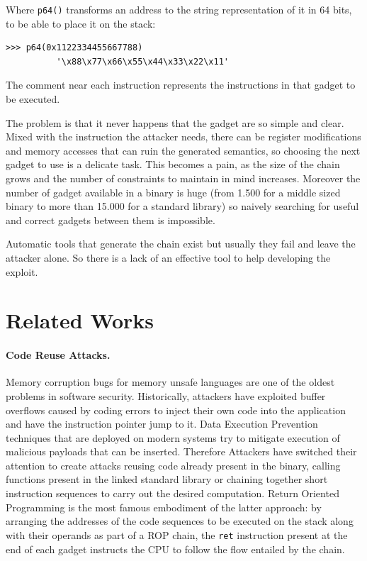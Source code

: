 \documentclass[twocolumn, 11pt]{article}
\begin{document}
\bigskip
Where \texttt{p64()} transforms an address to the string representation of it in 64 bits, to be able to place it on the stack:
\begin{lstlisting}
>>> p64(0x1122334455667788)
          '\x88\x77\x66\x55\x44\x33\x22\x11'
\end{lstlisting}

The comment near each instruction represents the instructions in that gadget to be executed.

\bigskip
The problem is that it never happens that the gadget are so simple and clear. Mixed with the instruction the attacker needs, there can be register modifications and memory accesses that can ruin the generated semantics, so choosing the next gadget to use is a delicate task. This becomes a pain, as the size of the chain grows and the number of constraints to maintain in mind increases.
Moreover the number of gadget available in a binary is huge (from 1.500 for a middle sized binary to more than 15.000 for a standard library) so naively searching for useful and correct gadgets between them is impossible.

 Automatic tools that generate the chain exist but usually they fail and leave the attacker alone. So there is a lack of an effective tool to help developing the exploit.

\section{Related Works}
\label{se:related}
\paragraph{Code Reuse Attacks.}
Memory corruption bugs for memory unsafe languages are one of the oldest problems in software security. Historically, attackers have exploited buffer overflows caused by coding errors to inject their own code into the application and have the instruction pointer jump to it. Data Execution Prevention techniques that are deployed on modern systems try to mitigate execution of malicious payloads that can be inserted. Therefore Attackers have switched their attention to create attacks reusing code already present in the binary, calling functions present in the linked standard library or chaining together short instruction sequences to carry out the desired computation. Return Oriented Programming is the most famous embodiment of the latter approach: by arranging the addresses of the code sequences to be executed on the stack along with their operands as part of a ROP chain, the {\tt ret} instruction present at the end of each gadget instructs the CPU to follow the flow entailed by the chain.
\end{document}

